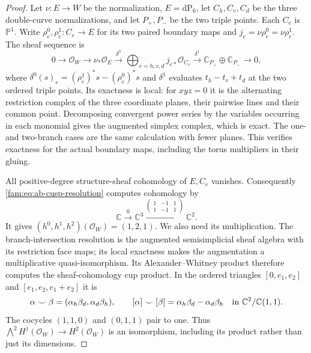 \begin{proof}
Let $\nu:E\to W$ be the normalization, $E=\mathrm{dP}_6$, let
$C_h,C_v,C_d$ be the three double-curve normalizations, and let
$P_+,P_-$ be the two triple points. Each $C_e$ is $\mathbb P^1$.
Write $\rho_e^0,\rho_e^1:C_e\to E$ for its two paired boundary maps
and $j_e=\nu\rho_e^0=\nu\rho_e^1$. The sheaf sequence is
\begin{equation}\label{fam:eq:ab-cusp-resolution}
 0\longrightarrow\mathcal O_W\longrightarrow\nu_*\mathcal O_E
 \xrightarrow{\delta^0}\bigoplus_{e=h,v,d}j_{e*}\mathcal O_{C_e}
 \xrightarrow{\delta^1}\mathbb C_{P_+}\oplus\mathbb C_{P_-}
 \longrightarrow0,
\end{equation}
where $\delta^0(s)_e=(\rho_e^1)^*s-(\rho_e^0)^*s$ and
$\delta^1$ evaluates $t_h-t_v+t_d$ at the two ordered triple points.
Its exactness is local: for $xyz=0$ it is the alternating restriction
complex of the three coordinate planes, their pairwise lines and their
common point. Decomposing convergent power series by the variables
occurring in each monomial gives the augmented simplex complex, which
is exact. The one- and two-branch cases are the same calculation with
fewer planes. This verifies exactness for the actual boundary maps,
including the torus multipliers in their gluing.

All positive-degree structure-sheaf cohomology of $E,C_e$ vanishes.
Consequently \eqref{fam:eq:ab-cusp-resolution} computes cohomology by
\[
 \mathbb C\xrightarrow{0}\mathbb C^3
 \xrightarrow{\left(\begin{smallmatrix}1&-1&1\\1&-1&1\end{smallmatrix}\right)}
 \mathbb C^2.
\]
It gives $(h^0,h^1,h^2)(\mathcal O_W)=(1,2,1)$.
We also need its multiplication. The branch-intersection resolution
is the augmented semisimplicial sheaf algebra with its restriction face
maps; its local exactness makes the augmentation a multiplicative
quasi-isomorphism. Its Alexander--Whitney product therefore computes
the sheaf-cohomology cup product. In the ordered triangles
$[0,e_1,e_2]$ and $[e_1,e_2,e_1+e_2]$ it is
\[
 \alpha\smile\beta=(\alpha_h\beta_d,\alpha_d\beta_h),
 \qquad [\alpha]\smile[\beta]
 =\alpha_h\beta_d-\alpha_d\beta_h
 \quad\hbox{in }\mathbb C^2/\mathbb C(1,1).
\]
The cocycles $(1,1,0)$ and $(0,1,1)$ pair to one. Thus
$\bigwedge^2H^1(\mathcal O_W)\to H^2(\mathcal O_W)$ is an
isomorphism, including its product rather than just its dimensions.


\end{proof}
